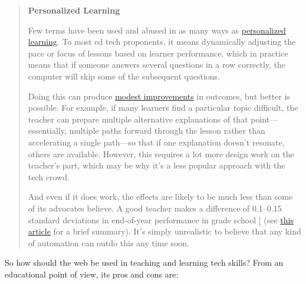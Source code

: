 \begin{quote}\setlength{\parindent}{0pt}
\textbf{Personalized Learning}

Few terms have been used and abused in as many ways as
\protect\hyperlink{g:personalized-learning}{personalized learning}. To most
ed tech proponents, it means dynamically adjusting the pace or focus
of lessons based on learner performance, which in practice means that
if someone answers several questions in a row correctly, the computer
will skip some of the subsequent questions.

Doing this can produce \href{https://www.rand.org/pubs/research_briefs/RB9994.html}{modest
improvements} in outcomes, but
better is possible. For example, if many learners find a particular
topic difficult, the teacher can prepare multiple alternative
explanations of that point---essentially, multiple paths forward
through the lesson rather than accelerating a single path---so that
if one explanation doesn't resonate, others are available. However,
this requires a lot more design work on the teacher's part, which
may be why it's a less popular approach with the tech crowd.

And even if it does work, the effects are likely to be much less
than some of its advocates believe. A good teacher makes a
difference of 0.1--0.15 standard deviations in end-of-year
performance in grade school {[}\protect[\hyperlink{b:Chet2014}{Chet2014}]{]} (see \href{http://educationnext.org/in-schools-teacher-quality-matters-most-coleman/}{this
article} for a brief summary). It's simply
unrealistic to believe that any kind of automation can outdo this
any time soon.
\end{quote}

So how should the web be used in teaching and learning tech skills? From
an educational point of view, its pros and cons are:

